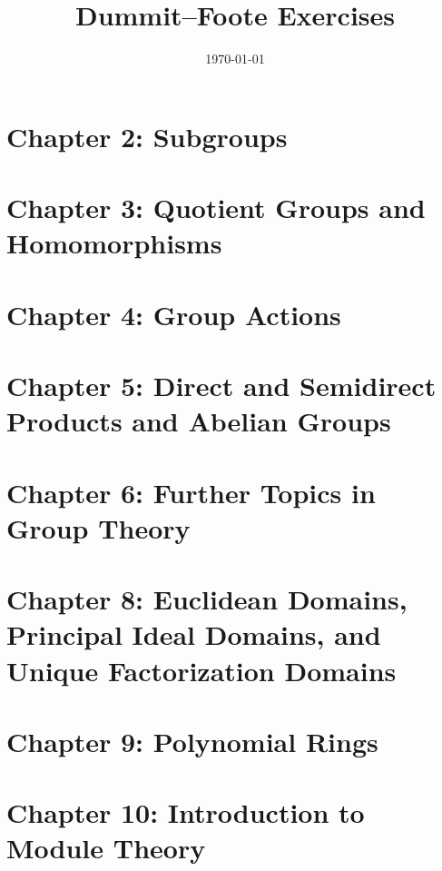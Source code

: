 \documentclass[11pt]{article}
\title{Dummit--Foote Exercises}
\date{\today}
\theoremstyle{definition}
\theoremstyle{remark}
\numberwithin{equation}{section}
\numberwithin{thm}{subsection}
\begin{document}
\maketitle



\section{Chapter 2: Subgroups}

\newpage

\section{Chapter 3: Quotient Groups and Homomorphisms}

\newpage

\section{Chapter 4: Group Actions}

\newpage

\section{Chapter 5: Direct and Semidirect Products and Abelian Groups}

\newpage

\section{Chapter 6: Further Topics in Group Theory}

\newpage



\section{Chapter 8: Euclidean Domains, Principal Ideal Domains, and Unique Factorization Domains}

\newpage

\section{Chapter 9: Polynomial Rings}

\newpage

\section{Chapter 10: Introduction to Module Theory}
\end{document}
